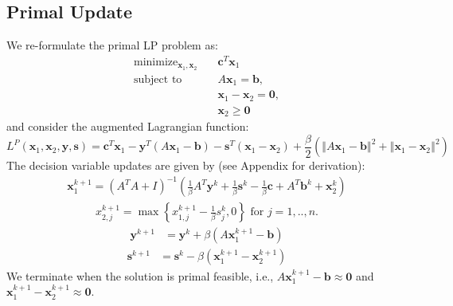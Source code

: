 \documentclass{article}
\begin{document}
\subsection*{Primal Update}
We re-formulate the primal LP problem as:
\begin{align}
\text{minimize}_{ \mathbf{x}_{1}, \mathbf{x}_{2}} &\quad \mathbf{c}^T\mathbf{x}_1 \tag{LPR}\label{LPR} \\
\text{subject to  \ \  } &\quad  A \mathbf{x}_{1} = \mathbf{b},  \nonumber \\
&\quad \mathbf{x}_{1}  - \mathbf{x}_{2} = \mathbf{0},  \nonumber \\
&\quad \mathbf{x}_{2} \geq \mathbf{0} \nonumber 
\end{align}
and consider the augmented Lagrangian function:
\[
L^{P}(\mathbf{x}_{1},\mathbf{x}_{2},\mathbf{y} ,\mathbf{s})=\mathbf{c}^{T}\mathbf{x}_{1}-\mathbf{y}^{T}\left(A\mathbf{x}_{1}-\mathbf{b}\right)-\mathbf{s}^{T}\left(\mathbf{x}_{1}-\mathbf{x}_{2}\right)+\frac{\beta}{2}\left(\left\Vert A\mathbf{x}_{1}-\mathbf{b}\right\Vert ^{2}+\left\Vert \mathbf{x}_{1}-\mathbf{x}_{2}\right\Vert ^{2}\right)
\]
The decision variable updates are given by (see Appendix for derivation):
\begin{align}\label{eq:x1_primal_update}
\mathbf{x}_{1}^{k+1} = \left(A^{T}A+I\right)^{-1}\left(\frac{1}{\beta}A^{T}\mathbf{y}^k+\frac{1}{\beta}\mathbf{s}^k-\frac{1}{\beta}\mathbf{c}+A^{T}\mathbf{b}^k+\mathbf{x}_{2}^k\right)
\end{align}
\begin{align}
{x}_{2,j}^{k+1} = \max\left\{ {x}_{1,j}^{k+1}-\frac{1}{\beta}{s}_j^k,0\right\} \text{ for $j = 1,..,n$}.
\end{align}
\begin{align}\label{eq:y_primal_update}
\mathbf{y}^{k+1} &= \mathbf{y}^{k} + \beta (A \mathbf{x}_1^{k+1}  - \mathbf{b}) 
\end{align}
\begin{align}\label{eq:s_primal_update}
\mathbf{s}^{k+1} &= \mathbf{s}^{k}  - \beta  (\mathbf{x}_1^{k+1}  -\mathbf{x}_2^{k+1} )
\end{align}
We terminate when the solution is primal feasible, i.e., $A \mathbf{x}_1^{k+1}  - \mathbf{b} \approx \mathbf{0}$ and $\mathbf{x}_1^{k+1}  -\mathbf{x}_2^{k+1} \approx \mathbf{0}$.

\end{document}
